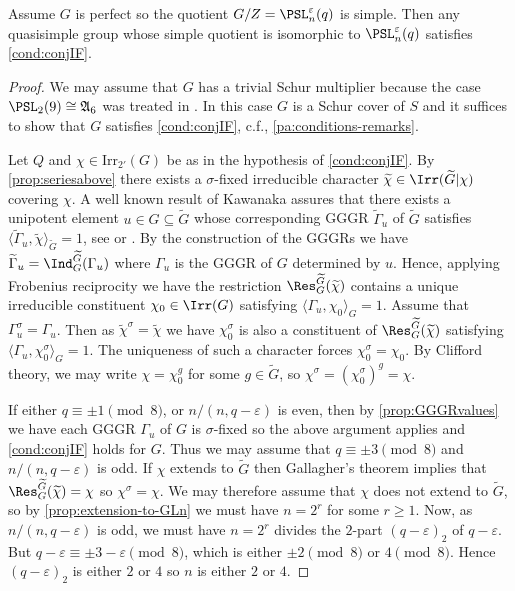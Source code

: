 \documentclass[eqthmnum, nocolour]{jt-calcs}
\newcommand{\irr}{\mathrm{Irr}}
\renewcommand{\epsilon}{\varepsilon}
\begin{document}
\begin{prop}\label{thm:notpm3mod8}
Assume $G$ is perfect so the quotient $G/Z = \PSL_n^\epsilon(q)$ is simple. Then any quasisimple group whose simple quotient is isomorphic to $\PSL_n^\epsilon(q)$ satisfies \cref{cond:conjIF}.
\end{prop}

\begin{proof}
We may assume that $G$ has a trivial Schur multiplier because the case $\PSL_2(9)\cong \mathfrak{A}_6$ was treated in \cite{schaeffer-fry:2015:odd-degree-characters}. In this case $G$ is a Schur cover of $S$ and it suffices to show that $G$ satisfies \cref{cond:conjIF}, c.f., \cref{pa:conditions-remarks}.

Let $Q$ and $\chi\in\irr_{2'}(G)$ be as in the hypothesis of \cref{cond:conjIF}. By \cref{prop:seriesabove} there exists a $\sigma$-fixed irreducible character $\widetilde{\chi} \in \Irr(\widetilde{G}|\chi)$ covering $\chi$. A well known result of Kawanaka assures that there exists a unipotent element $u \in G \subseteq \widetilde{G}$ whose corresponding GGGR $\widetilde{\Gamma}_u$ of $\widetilde{G}$ satisfies $\langle \widetilde{\Gamma}_u, \widetilde{\chi}\rangle_{\widetilde{G}} = 1$, see \cite[3.2.18]{kawanaka:1985:GGGRs-and-ennola-duality} or \cite[15.7]{taylor:2016:GGGRs-small-characteristics}. By the construction of the GGGRs we have $\widetilde{\Gamma}_u = \Ind_G^{\widetilde{G}}(\Gamma_u)$ where $\Gamma_u$ is the GGGR of $G$ determined by $u$. Hence, applying Frobenius reciprocity we have the restriction $\Res_G^{\widetilde{G}}(\widetilde{\chi})$ contains a unique irreducible constituent $\chi_0 \in \Irr(G)$ satisfying $\langle \Gamma_u, \chi_0 \rangle_G = 1$. Assume that $\Gamma_u^{\sigma} = \Gamma_u$. Then as $\widetilde{\chi}^{\sigma} = \widetilde{\chi}$ we have $\chi_0^\sigma$ is also a constituent of $\Res_G^{\widetilde{G}}(\widetilde{\chi})$ satisfying $\langle \Gamma_u, \chi_0^\sigma\rangle_G=1$. The uniqueness of such a character forces $\chi_0^{\sigma} = \chi_0$. By Clifford theory, we may write $\chi=\chi_0^g$ for some $g\in \widetilde{G}$, so $\chi^{\sigma} = (\chi_0^{\sigma})^g = \chi$.

If either $q\equiv \pm1\pmod 8$, or $n/(n,q-\epsilon)$ is even, then by \cref{prop:GGGRvalues} we have each GGGR $\Gamma_u$ of $G$ is $\sigma$-fixed so the above argument applies and \cref{cond:conjIF} holds for $G$. Thus we may assume that $q\equiv\pm3 \pmod{8}$ and $n/(n,q-\epsilon)$ is odd. If $\chi$ extends to $\widetilde{G}$ then Gallagher's theorem implies that $\Res_G^{\widetilde{G}}(\widetilde{\chi}) = \chi$ so $\chi^{\sigma} = \chi$. We may therefore assume that $\chi$ does not extend to $\widetilde{G}$, so by \cref{prop:extension-to-GLn} we must have $n = 2^r$ for some $r \geqslant 1$. Now, as $n/(n,q-\epsilon)$ is odd, we must have $n = 2^r$ divides the $2$-part $(q-\varepsilon)_2$ of $q-\varepsilon$. But $q - \varepsilon \equiv \pm 3 - \varepsilon \pmod{8}$, which is either $\pm 2 \pmod{8}$ or $4 \pmod{8}$. Hence $(q-\varepsilon)_2$ is either $2$ or $4$ so $n$ is either $2$ or $4$.


\end{proof}
\end{document}

